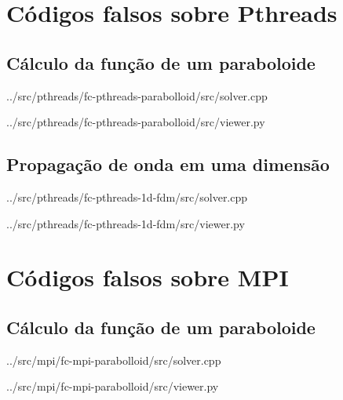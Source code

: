 \begin{appendices}
\chapter{Códigos falsos sobre Pthreads}
\section{Cálculo da função de um paraboloide}

{../src/pthreads/fc-pthreads-parabolloid/src/solver.cpp}


{../src/pthreads/fc-pthreads-parabolloid/src/viewer.py}

\section{Propagação de onda em uma dimensão}

{../src/pthreads/fc-pthreads-1d-fdm/src/solver.cpp}


{../src/pthreads/fc-pthreads-1d-fdm/src/viewer.py}

\chapter{Códigos falsos sobre MPI}
\section{Cálculo da função de um paraboloide}

{../src/mpi/fc-mpi-parabolloid/src/solver.cpp}


{../src/mpi/fc-mpi-parabolloid/src/viewer.py}


\end{appendices}
